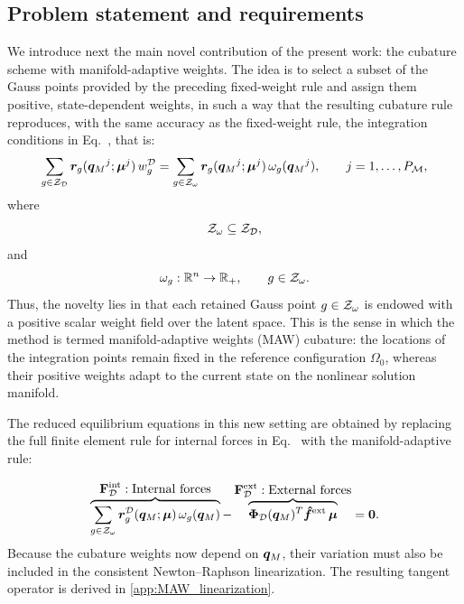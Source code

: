 \documentclass[preprint,10pt]{elsarticle}  %
\newcommand{\PROMPT}[1]{ }
\begin{document}
\subsection{Problem statement and requirements}
\label{sec:motivation_MAW_ECM}
%
We  introduce next the main novel contribution of the present work: the cubature scheme with manifold-adaptive weights.  The idea is to select a
subset of the Gauss points provided by the preceding fixed-weight rule
and assign them positive, state-dependent weights, in such a way that the resulting cubature rule reproduces, with the same accuracy as the fixed-weight rule, the integration conditions in Eq.~, that is:
\begin{equation}
\label{eq:approxGEN2}
\sum_{g\in\mathcal{Z}_{\mathcal{D}}}
\bm{r}_{g}({\bm{q}_M}^{j};\bm{\mu}^{j})\,w^{\mathcal{D}}_{g}
=
\sum_{g\in\mathcal{Z}_{\omega}}
\bm{r}_{g}({\bm{q}_M}^{j};\bm{\mu}^{j})\,
\omega_{g}({\bm{q}_M}^{j}),
\qquad
j=1,\ldots,P_{\mathcal{M}},
\end{equation}
where
\begin{equation}
\label{eq:Zomega_subset_ZD}
\mathcal{Z}_{\omega}\subseteq\mathcal{Z}_{\mathcal{D}},
\end{equation}
and
\begin{equation}
\label{eq:adaptive_weight_map}
\omega_{g}:\mathbb{R}^{n}\rightarrow\mathbb{R}_{+},
\qquad g\in\mathcal{Z}_{\omega}.
\end{equation}
Thus, the novelty lies in that  each retained Gauss point \(g\in\mathcal{Z}_{\omega}\) is endowed with a positive
scalar weight field over the latent space. This is the sense in which
the method is termed manifold-adaptive weights (MAW) cubature: the
locations of the integration points remain fixed in the reference
configuration $\Omega_0$, whereas their positive weights adapt to the current
state on the nonlinear solution manifold.

%
%
% 


The   reduced
equilibrium equations in this new setting are obtained by replacing the
full finite element rule for internal forces in Eq.~ with the manifold-adaptive rule:


\begin{equation}
\label{eq:MAW_ROM_equilibrium}
\overbrace{
\sum_{g\in\mathcal{Z}_{\omega}}
\bm{r}^{\mathcal{D}}_{g}(\bm{q}_M;\bm{\mu})\,
\omega_{g}(\bm{q}_M)
}^{\displaystyle\displaystyle \mathbf{F}^{\mathrm{int}}_{\mathcal{D}}:\textrm{Internal forces}}
-
\overbrace{
\bm{\Phi}_{\mathcal{D}}(\bm{q}_M)^T\bm{\hat{f}}^{\mathrm{ext}}\,\bm{\mu}
}^{\displaystyle\mathbf{F}^{\mathrm{ext}}_{\mathcal{D}}:\textrm{External forces}}
=
\bm{0}.
\end{equation}
  Because
the cubature weights now depend on \(\bm{q}_M\), their variation must also
be included in the consistent Newton--Raphson linearization. The resulting tangent operator  is
derived in \ref{app:MAW_linearization}.
\end{document}
